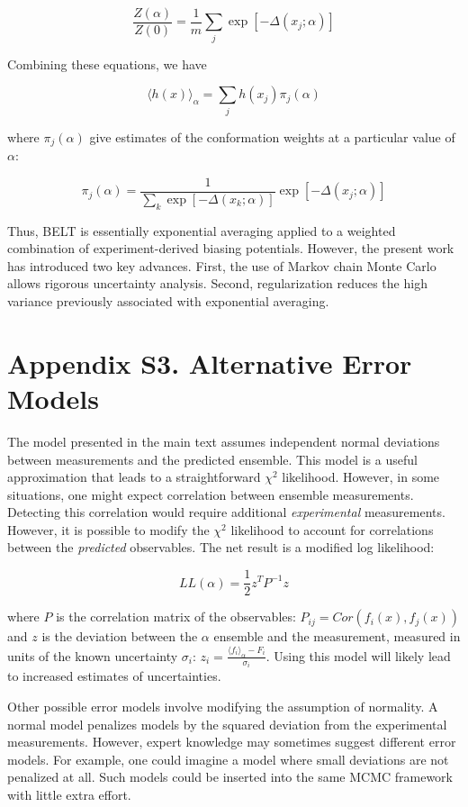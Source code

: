 \documentclass[12pt]{article}
\begin{document}
$$ \frac{Z(\alpha)}{Z(0)} = \frac{1}{m} \sum_j \exp[-\Delta(x_j;\alpha)]$$

Combining these equations, we have

$$\langle h(x)\rangle _\alpha = \sum_j h(x_j) \pi_j(\alpha)$$

where $\pi_j(\alpha)$ give estimates of the conformation weights at a particular value of $\alpha$:

$$\pi_j(\alpha) = \frac{1}{\sum_k \exp[-\Delta(x_k;\alpha)]} \exp[-\Delta(x_j;\alpha)]$$

Thus, BELT is essentially exponential averaging applied to a weighted combination of experiment-derived biasing potentials.  However, the present work has introduced two key advances.  First, the use of Markov chain Monte Carlo allows rigorous uncertainty analysis.  Second, regularization reduces the high variance previously associated with exponential averaging.  

\newpage

\section*{Appendix S3.  Alternative Error Models}

The model presented in the main text assumes independent normal deviations between measurements and the predicted ensemble.  This model is a useful approximation that leads to a straightforward $\chi^2$ likelihood.  However, in some situations, one might expect correlation between ensemble measurements.  Detecting this correlation would require additional \emph{experimental} measurements.  However, it is possible to modify the $\chi^2$ likelihood to account for correlations between the \emph{predicted} observables.  The net result is a modified log likelihood:

$$L L(\alpha) = \frac{1}{2} z^T P^{-1} z$$

where $P$ is the correlation matrix of the observables: $P_{ij} = Cor(f_i(x), f_j(x))$ and $z$ is the deviation between the $\alpha$ ensemble and the measurement, measured in units of the known uncertainty $\sigma_i$: $z_i = \frac{\langle f_i\rangle _\alpha - F_i}{\sigma_i}$.  Using this model will likely lead to increased estimates of uncertainties.  

Other possible error models involve modifying the assumption of normality.  A normal model penalizes models by the squared deviation from the experimental measurements.  However, expert knowledge may sometimes suggest different error models.  For example, one could imagine a model where small deviations are not penalized at all.  Such models could be inserted into the same MCMC framework with little extra effort.
\end{document}
